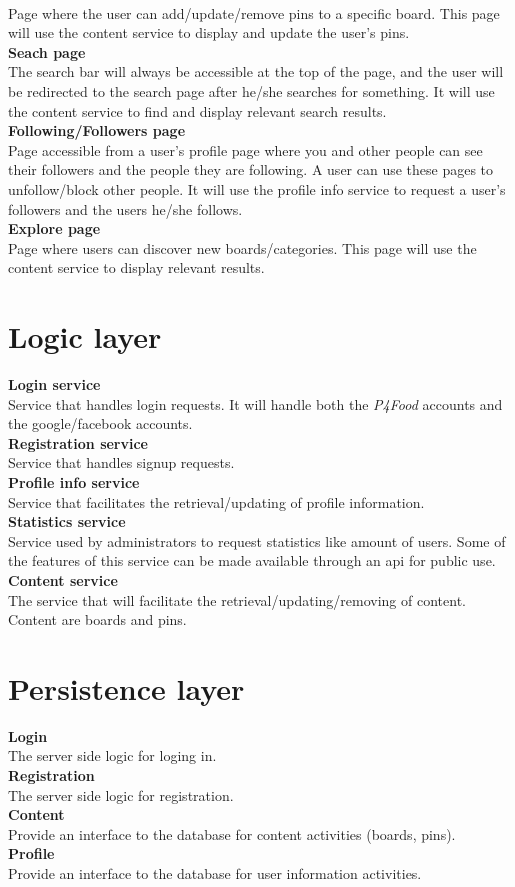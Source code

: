 \documentclass[a4paper]{article}
\begin{document}
\\Page where the user can add/update/remove pins to a specific board. This page will use the content service to display and update the user's pins.
\pagebreak
\\[10px] \textbf{Seach page}
\\The search bar will always be accessible at the top of the page, and the user will be redirected to the search page after he/she searches for something. It will use the content service to find and display relevant search results.
\\[10px] \textbf{Following/Followers page}
\\Page accessible from a user's profile page where  you and other people can see their followers and the people they are following. A user can use these pages to unfollow/block other people. It will use the profile info service to request a user's followers and the users he/she follows.
\\[10px] \textbf{Explore page}
\\Page where users can discover new boards/categories. This page will use the content service to display relevant results.

\section{Logic layer}
\textbf{Login service}
\\Service that handles login requests. It will handle both the \textit{P4Food} accounts and the google/facebook accounts. 
\\[10px] \textbf{Registration service}
\\Service that handles signup requests.  
\\[10px] \textbf{Profile info service}
\\Service that facilitates the retrieval/updating of profile information.
\\[10px] \textbf{Statistics service}
\\Service used by administrators to request statistics like amount of users. Some of the features of this service can be made available through an api for public use.
\\[10px] \textbf{Content service}
\\The service that will facilitate the retrieval/updating/removing of content. Content are boards and pins.

\section{Persistence layer}
\textbf{Login}
\\The server side logic for loging in.
\\[10px] \textbf{Registration}
\\The server side logic for registration.
\\[10px] \textbf{Content}
\\Provide an interface to the database for content activities (boards, pins).
\\[10px] \textbf{Profile}
\\Provide an interface to the database for user information activities.
\end{document}
